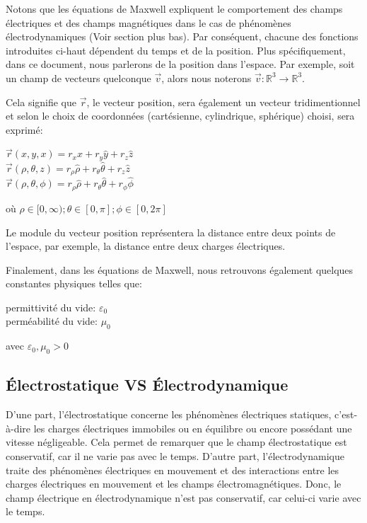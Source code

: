 \documentclass[12pt]{article}
\begin{document}
\noindent Notons que les équations de Maxwell expliquent le comportement des champs électriques et des champs magnétiques dans le cas de phénomènes électrodynamiques (Voir section plus bas). Par conséquent, chacune des fonctions introduites ci-haut dépendent du temps et de la position. Plus spécifiquement, dans ce document, nous parlerons de la position dans l'espace. Par exemple, soit un champ de vecteurs quelconque $\vec{v}$, alors nous noterons $\vec{v}:\mathbb{R}^3 \to \mathbb{R}^3.$ 

\noindent Cela signifie que $\vec{r}$, le vecteur position, sera également un vecteur tridimentionnel et selon le choix de coordonnées (cartésienne, cylindrique, sphérique) choisi, sera exprimé:
\begin{center}
    $\vec{r}(x,y,x)=r_x\hat{x}+r_y\hat{y}+r_z\hat{z}$
    \\$\vec{r}(\rho,\theta,z)= r_\rho \hat{\rho}+r_\theta \hat{\theta}+r_z \hat{z}$
    \\$\vec{r}(\rho,\theta,\phi)= r_\rho\hat{\rho}+r_\theta \hat{\theta}+r_\phi \hat{\phi}$
\end{center}
\noindent où   $\rho \in [0,\infty) ; \theta \in [0,\pi] ; \phi \in [0,2\pi]$

\noindent Le module du vecteur position représentera la distance entre deux points de l'espace, par exemple, la distance entre deux charges électriques.

\noindent Finalement, dans les équations de Maxwell, nous retrouvons également quelques constantes physiques telles que:
\begin{center}
    permittivité du vide: $\varepsilon_0$
   \\ perméabilité du vide: $\mu_0$
\end{center}
\noindent avec $\varepsilon_0, \mu_0 > 0$

\subsection*{Électrostatique VS Électrodynamique}
\noindent D'une part, l'électrostatique concerne les phénomènes électriques statiques, c'est-à-dire les charges électriques immobiles ou en équilibre ou encore possédant une vitesse négligeable. Cela permet de remarquer que le champ électrostatique est conservatif, car il ne varie pas avec le temps. D'autre part, l'électrodynamique traite des phénomènes électriques en mouvement et des interactions entre les charges électriques en mouvement et les champs électromagnétiques. Donc, le champ électrique en électrodynamique n'est pas conservatif, car celui-ci varie avec le temps.
\end{document}
